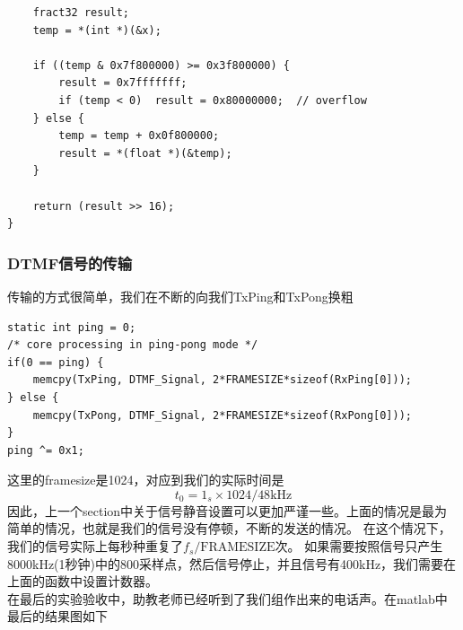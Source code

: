 \documentclass{article}
\begin{document}
\begin{CJK}{UTF8}{gbsn}
\begin{lstlisting}
	fract32 result;
	temp = *(int *)(&x);

	if ((temp & 0x7f800000) >= 0x3f800000) {
	    result = 0x7fffffff;
	    if (temp < 0)  result = 0x80000000;  // overflow
	} else {
	    temp = temp + 0x0f800000;
	    result = *(float *)(&temp);
	}

	return (result >> 16);
}
\end{lstlisting}
\subsubsection{DTMF信号的传输}
传输的方式很简单，我们在不断的向我们TxPing和TxPong换粗
\begin{lstlisting}
static int ping = 0;
/* core processing in ping-pong mode */
if(0 == ping) {
	memcpy(TxPing, DTMF_Signal, 2*FRAMESIZE*sizeof(RxPing[0]));
} else {
	memcpy(TxPong, DTMF_Signal, 2*FRAMESIZE*sizeof(RxPong[0]));
}
ping ^= 0x1;
\end{lstlisting}
这里的framesize是1024，对应到我们的实际时间是
\begin{equation}
t_0 = 1_s \times 1024 / 48\mbox{kHz}
\end{equation}
因此，上一个section中关于信号静音设置可以更加严谨一些。上面的情况是最为简单的情况，也就是我们的信号没有停顿，不断的发送的情况。
在这个情况下，我们的信号实际上每秒种重复了\(f_s / \mbox{FRAMESIZE}\)次。
如果需要按照信号只产生8000kHz(1秒钟)中的800采样点，然后信号停止，并且信号有400kHz，我们需要在上面的函数中设置计数器。\\
在最后的实验验收中，助教老师已经听到了我们组作出来的电话声。在matlab中最后的结果图如下
\begin{figure}[h!]
\centering
{}

\end{figure}
\end{CJK}
\end{document}
